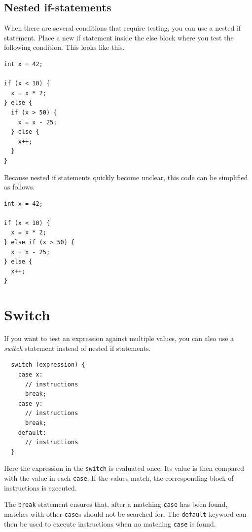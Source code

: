 \documentclass[11pt,fleqn]{book} %
\begin{document}
\subsection{Nested if-statements}
When there are several conditions that require testing, you can use a nested if statement. Place a new if statement inside the else block where you test the following condition. This looks like this.

\begin{example}
	\phantom{ }
	\begin{verbatim}
int x = 42;

if (x < 10) {
  x = x * 2;
} else {
  if (x > 50) {
    x = x - 25;
  } else {
    x++;
  }
}
	\end{verbatim}
\end{example}

\noindent
Because nested if statements quickly become unclear, this code can be simplified as follows.

\begin{example}[Else-if]
	\phantom{ }
	\begin{verbatim}
int x = 42;

if (x < 10) {
  x = x * 2;
} else if (x > 50) {
  x = x - 25;
} else {
  x++;
}
	\end{verbatim}
\end{example}

\section{Switch}
If you want to test an expression against multiple values, you can also use a \emph{switch} statement instead of nested if statements.\\

\begin{definition}[Switch]
	\phantom{ }
	\begin{verbatim}
  switch (expression) {
    case x:
      // instructions
      break;
    case y:
      // instructions
      break;
    default:
      // instructions
  }
	\end{verbatim}
\end{definition}

\noindent
Here the expression in the \texttt{switch} is evaluated once. Its value is then compared with the value in each \texttt{case}. If the values match, the corresponding block of instructions is executed.

The \texttt{break} statement ensures that, after a matching \texttt{case} has been found, matches with other \texttt{case}s should not be searched for. The \texttt{default} keyword can then be used to execute instructions when no matching \texttt{case} is found.
\end{document}
